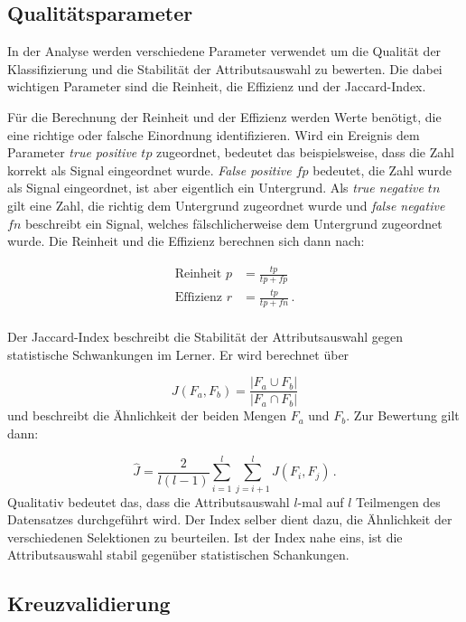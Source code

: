 \subsection{Qualitätsparameter}
In der Analyse werden verschiedene Parameter verwendet um die Qualität der Klassifizierung 
und die Stabilität der Attributsauswahl zu bewerten. Die dabei wichtigen Parameter 
sind die Reinheit, die Effizienz und der Jaccard-Index. \par 
Für die Berechnung der Reinheit und der Effizienz werden Werte benötigt, die 
eine richtige oder falsche Einordnung identifizieren. Wird ein Ereignis dem 
Parameter \textit{true positive $tp$} zugeordnet, bedeutet das beispielsweise,
dass die Zahl korrekt als Signal eingeordnet wurde. \textit{False positive $fp$} 
bedeutet, die Zahl wurde als Signal eingeordnet, ist aber eigentlich ein
Untergrund. Als \textit{true negative $tn$} gilt eine Zahl, die richtig dem Untergrund 
zugeordnet wurde und \textit{false negative $fn$} beschreibt ein Signal, welches 
fälschlicherweise dem Untergrund zugeordnet wurde. Die Reinheit und die Effizienz 
berechnen sich dann nach:

\begin{align*}
    \text{Reinheit}\, \, p &= \frac{tp}{tp + fp} \\ 
    \text{Effizienz}\, \, r &= \frac{tp}{tp + fn} \, .\\ 
\end{align*}

Der Jaccard-Index beschreibt die Stabilität der Attributsauswahl gegen statistische 
Schwankungen im Lerner. Er wird berechnet über 

\begin{equation*}
    J \left(F_a, F_b \right) = \frac{|F_a \cup F_b|}{|F_a \cap F_b|}
\end{equation*}
und beschreibt die Ähnlichkeit der beiden Mengen $F_a$ und $F_b$. Zur Bewertung 
gilt dann: 

\begin{equation*}
    \hat{J} = \frac{2}{l \left(l - 1 \right)} \sum\limits_{i = 1}^{l}\sum\limits_{j = i+1}^{l} J\left(F_i, F_j \right) \, .
\end{equation*}
Qualitativ bedeutet das, dass die Attributsauswahl $l$-mal auf $l$ Teilmengen des Datensatzes durchgeführt wird. Der Index 
selber dient dazu, die Ähnlichkeit der verschiedenen Selektionen zu beurteilen. Ist der Index nahe eins, ist die 
Attributsauswahl stabil gegenüber statistischen Schankungen.

\subsection{Kreuzvalidierung}

